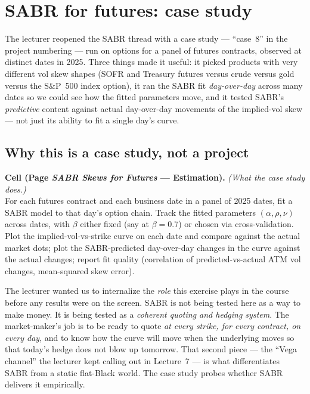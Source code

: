 \section{SABR for futures: case study}\label{L8-sec:sabrfutures}

The lecturer reopened the SABR thread with a case study --- ``case~8''
in the project numbering --- run on options for a panel of futures
contracts, observed at distinct dates in 2025. Three things made it
useful: it picked products with very different vol skew shapes
(SOFR and Treasury futures versus crude versus gold versus the
S\&P~500 index option), it ran the SABR fit \emph{day-over-day}
across many dates so we could see how the fitted parameters move,
and it tested SABR's \emph{predictive} content against actual
day-over-day movements of the implied-vol skew --- not just its
ability to fit a single day's curve.

\subsection{Why this is a case study, not a project}\label{L8-sec:caseornot}

\begin{keyblock}
\textbf{Cell (Page \emph{SABR Skews for Futures} --- Estimation).}
\emph{(What the case study does.)}\\
For each futures contract and each business date in a panel of 2025
dates, fit a SABR model to that day's option chain. Track the fitted
parameters $(\alpha, \rho, \nu)$ across dates, with $\beta$ either
fixed (say at $\beta = 0.7$) or chosen via cross-validation. Plot the
implied-vol-vs-strike curve on each date and compare against the
actual market dots; plot the SABR-predicted day-over-day changes in
the curve against the actual changes; report fit quality (correlation
of predicted-vs-actual ATM vol changes, mean-squared skew error).
\end{keyblock}

The lecturer wanted us to internalize the \emph{role} this exercise
plays in the course before any results were on the screen. SABR is
not being tested here as a way to make money. It is being tested as
a \emph{coherent quoting and hedging system}. The market-maker's job
is to be ready to quote \emph{at every strike, for every contract,
on every day}, and to know how the curve will move when the
underlying moves so that today's hedge does not blow up tomorrow.
That second piece --- the ``Vega channel'' the lecturer kept calling
out in Lecture~7 --- is what differentiates SABR from a static
flat-Black world. The case study probes whether SABR delivers it
empirically.

